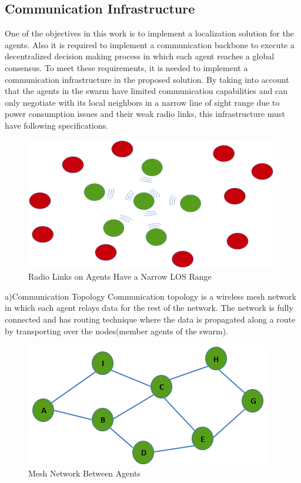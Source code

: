 \subsection{Communication Infrastructure}
One of the objectives in this work is to implement a localization solution for the agents. Also it is required to implement a communication backbone to execute a decentralized decision making process in which each agent reaches a global consensus. To meet these requirements, it is needed to implement a communication infrastructure in the proposed solution. By taking into account that the agents in the swarm have limited communication capabilities and can only negotiate with its local neighbors in a narrow line of sight range due to power consumption issues and their weak radio links, this infrastructure must have following specifications.

\begin{figure}[H]
\caption{Radio Links on Agents Have a Narrow LOS Range}
\centering
\includegraphics[scale = 1]{narrow_los}
\end{figure}

a)Communication Topology \newline
Communication topology is a wireless mesh network in which each agent relays data for the rest of the network. The network is fully connected and has routing technique where the data is propagated along a route by transporting over the nodes(member agents of the swarm).

\begin{figure}[H]
\caption{Mesh Network Between Agents}
\centering
\includegraphics[scale = 1]{mesh}
\end{figure} 

